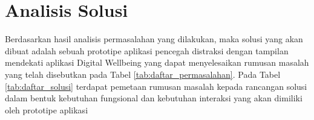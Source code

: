 \section{Analisis Solusi}
\label{sec:analisis_solusi}


Berdasarkan hasil analisis permasalahan yang dilakukan, maka solusi yang akan dibuat adalah sebuah prototipe aplikasi pencegah distraksi dengan tampilan mendekati aplikasi Digital Wellbeing yang dapat menyelesaikan rumusan masalah yang telah disebutkan pada Tabel \ref{tab:daftar_permasalahan}. Pada Tabel \ref{tab:daftar_solusi} terdapat pemetaan rumusan masalah kepada rancangan solusi dalam bentuk kebutuhan fungsional dan kebutuhan interaksi yang akan dimiliki oleh prototipe aplikasi

